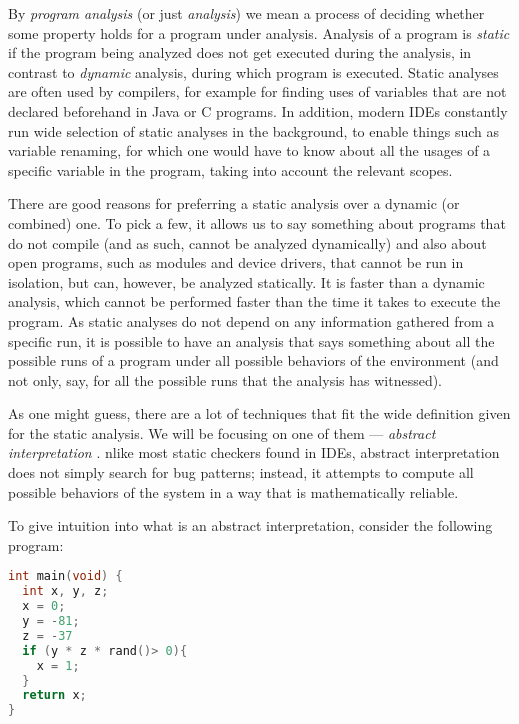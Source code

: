 \documentclass[..thesis.tex]{subfiles}
\begin{document}

By \textit{program analysis} (or just \textit{analysis}) we mean a process of deciding whether some property holds for a program under analysis.
Analysis of a program is \textit{static} if the program being analyzed does not get executed during the analysis, in contrast to \textit{dynamic} analysis,
during which program is executed. Static analyses are often used by compilers, for example for finding uses of variables that are not declared beforehand
in Java or C programs. In addition, modern IDEs constantly run wide selection of static analyses in the background, to enable things such as variable renaming,
for which one would have to know about all the usages of a specific variable in the program, taking into account the relevant scopes. 



There are good reasons for preferring a static analysis over a dynamic (or combined) one.
To pick a few, it allows us to say something about programs that do not compile (and as such, cannot be analyzed dynamically) and also about open programs,
such as modules and device drivers, that cannot be run in isolation, but can, however, be analyzed statically.  
It is faster than a dynamic analysis, which cannot be performed faster than the time it takes to execute the program.
As static analyses do not depend on any information gathered from a specific run, it is possible to have an analysis that says something
about all the possible runs of a program under all possible behaviors of the environment (and not only, say, for all the possible runs that the analysis has witnessed).



As one might guess, there are a lot of techniques that fit the wide definition given for the static analysis.
We will be focusing on one of them --- \textit{abstract interpretation} \cite{cousot_abstract_1977}. 
nlike most static checkers found in IDEs, abstract interpretation does not simply search for bug patterns; instead,
it attempts to compute all possible behaviors of the system in a way that is mathematically reliable.



To give intuition into what is an abstract interpretation, consider the following program:

\begin{lstlisting}[language=C,style=def]
int main(void) {
  int x, y, z;
  x = 0;
  y = -81;
  z = -37
  if (y * z * rand()> 0){
    x = 1;
  }
  return x;
}
\end{lstlisting}
\end{document}
